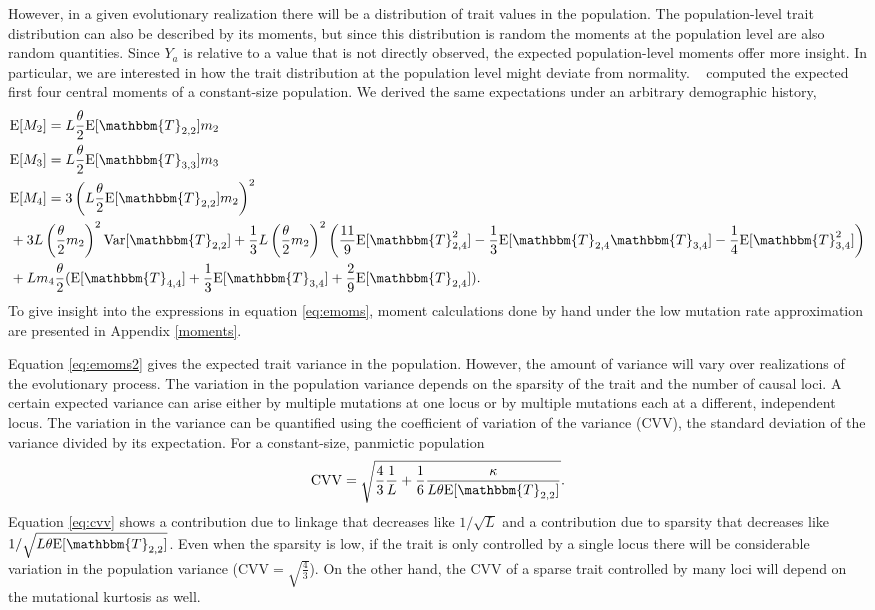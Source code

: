 However, in a given evolutionary realization there will be a distribution of
trait values in the population. The population-level trait distribution can also
be described by its moments, but since this distribution is random the moments
at the population level are also random quantities. Since $Y_a$ is relative to a
value that is not directly observed, the expected population-level moments offer
more insight. In particular, we are interested in how the trait distribution at
the population level might deviate from normality. ~\citet{Schraiber2015}
computed the expected first four central moments of a constant-size population.
We derived the same expectations under an arbitrary demographic history,
\begin{subequations} \label{eq:emoms}
\begin{align}
  &\E[M_2] = L \T \E[\mathbbm{T}_{2,2}] m_2 \label{eq:emoms2}\\
  &\E[M_3] = L \T \E[\mathbbm{T}_{3,3}] m_3  \label{eq:emoms3}\\
  &\E[M_4] = 3\left(L \T \E[\mathbbm{T}_{2,2}] m_2\right)^2 \nonumber \\
  &+ 3L \left(\T m_2\right)^2\Var[\mathbbm{T}_{2,2}] + \frac{1}{3}
  L \left(\T m_2\right)^2
    \left( \frac{11}{9} \E[\mathbbm{T}_{2,4}^2]-\frac{1}{3}\E[\mathbbm{T}_{2,4}\mathbbm{T}_{3,4}]-
    \frac{1}{4}\E[\mathbbm{T}_{3,4}^2]\right) \nonumber \\
  &+ L m_4 \T ( \E[\mathbbm{T}_{4,4}] + \frac{1}{3} \E[\mathbbm{T}_{3,4}] +
    \frac{2}{9} \E[\mathbbm{T}_{2,4}] ).
  \label{eq:emoms4}
\end{align}
\end{subequations}
To give insight into the expressions in equation \eqref{eq:emoms}, moment
calculations done by hand under the low mutation rate approximation are
presented in Appendix \ref{moments}.

Equation \eqref{eq:emoms2} gives the expected trait variance in the population.
However, the amount of variance will vary over realizations of the evolutionary
process. The variation in the population variance depends on the sparsity of the
trait and the number of causal loci. A certain expected variance can arise
either by multiple mutations at one locus or by multiple mutations each at a
different, independent locus. The variation in the variance can be quantified
using the coefficient of variation of the variance (CVV), the standard deviation
of the variance divided by its expectation. For a constant-size, panmictic
population
\begin{equation}
  \label{eq:cvv}
  \mathrm{CVV} = \sqrt{\frac{4}{3}\frac{1}{L} +
    \frac{1}{6}\frac{\kappa}{L\theta \E[\mathbbm{T}_{2,2}]}}.
\end{equation}
Equation \eqref{eq:cvv} shows a contribution due to linkage that decreases like
$1/\sqrt{L}$ and a contribution due to sparsity that decreases like
$1/\sqrt{L\theta \E[\mathbbm{T}_{2,2}]}$. Even when the sparsity is low, if the
trait is only controlled by a single locus there will be considerable variation
in the population variance (CVV$=\sqrt{\frac{4}{3}}$). On the other hand, the
CVV of a sparse trait controlled by many loci will depend on the mutational
kurtosis as well.
